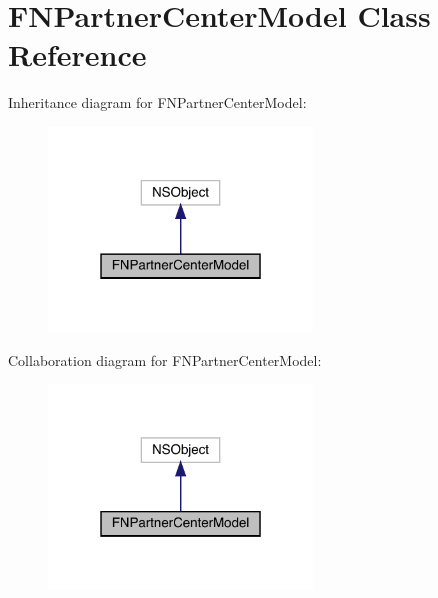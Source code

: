 \hypertarget{interface_f_n_partner_center_model}{}\section{F\+N\+Partner\+Center\+Model Class Reference}
\label{interface_f_n_partner_center_model}


Inheritance diagram for F\+N\+Partner\+Center\+Model\+:\nopagebreak
\begin{figure}[H]
\begin{center}
\leavevmode
\includegraphics[width=199pt]{interface_f_n_partner_center_model__inherit__graph}
\end{center}
\end{figure}


Collaboration diagram for F\+N\+Partner\+Center\+Model\+:\nopagebreak
\begin{figure}[H]
\begin{center}
\leavevmode
\includegraphics[width=199pt]{interface_f_n_partner_center_model__coll__graph}
\end{center}
\end{figure}
